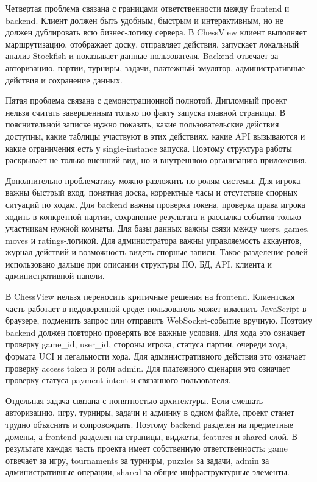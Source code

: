Четвертая проблема связана с границами ответственности между frontend и backend. Клиент должен быть удобным, быстрым и интерактивным, но не должен дублировать всю бизнес-логику сервера. В ChessView клиент выполняет маршрутизацию, отображает доску, отправляет действия, запускает локальный анализ Stockfish и показывает данные пользователя. Backend отвечает за авторизацию, партии, турниры, задачи, платежный эмулятор, административные действия и сохранение данных.

Пятая проблема связана с демонстрационной полнотой. Дипломный проект нельзя считать завершенным только по факту запуска главной страницы. В пояснительной записке нужно показать, какие пользовательские действия доступны, какие таблицы участвуют в этих действиях, какие API вызываются и какие ограничения есть у single-instance запуска. Поэтому структура работы раскрывает не только внешний вид, но и внутреннюю организацию приложения.



Дополнительно проблематику можно разложить по ролям системы. Для игрока важны быстрый вход, понятная доска, корректные часы и отсутствие спорных ситуаций по ходам. Для backend важны проверка токена, проверка права игрока ходить в конкретной партии, сохранение результата и рассылка события только участникам нужной комнаты. Для базы данных важны связи между users, games, moves и ratings-логикой. Для администратора важны управляемость аккаунтов, журнал действий и возможность видеть спорные записи. Такое разделение ролей использовано дальше при описании структуры ПО, БД, API, клиента и административной панели.

В ChessView нельзя переносить критичные решения на frontend. Клиентская часть работает в недоверенной среде: пользователь может изменить JavaScript в браузере, подменить запрос или отправить WebSocket-событие вручную. Поэтому backend должен повторно проверять все важные условия. Для хода это означает проверку game_id, user_id, стороны игрока, статуса партии, очереди хода, формата UCI и легальности хода. Для административного действия это означает проверку access token и роли admin. Для платежного сценария это означает проверку статуса payment intent и связанного пользователя.

Отдельная задача связана с понятностью архитектуры. Если смешать авторизацию, игру, турниры, задачи и админку в одном файле, проект станет трудно объяснять и сопровождать. Поэтому backend разделен на предметные домены, а frontend разделен на страницы, виджеты, features и shared-слой. В результате каждая часть проекта имеет собственную ответственность: game отвечает за игру, tournaments за турниры, puzzles за задачи, admin за административные операции, shared за общие инфраструктурные элементы.

